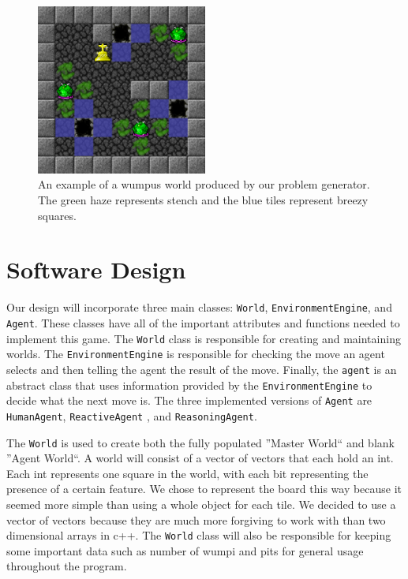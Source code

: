 \documentclass{article}
\begin{document}
		\begin{figure}
			\centering
			\includegraphics[width=0.5\textwidth]{images/ex_ww}
			\caption{An example of a wumpus world produced by our problem generator. The green haze represents stench and the blue tiles represent breezy squares.}
			\label{ex_ww}
		\end{figure}
	
	\section{Software Design}
		Our design will incorporate three main classes: \texttt{World}, \texttt{EnvironmentEngine}, and \texttt{Agent}. 
		These classes have all of the important attributes and functions needed to implement this game.
		The \texttt{World} class is responsible for creating and maintaining worlds.
		The \texttt{EnvironmentEngine} is responsible for checking the move an agent selects and then telling the agent the result of the move.
		Finally, the \texttt{agent} is an abstract class that uses information provided by the \texttt{EnvironmentEngine} to decide what the next move is. The three implemented versions of \texttt{Agent} are \texttt{HumanAgent}, \texttt{ReactiveAgent} , and \texttt{ReasoningAgent}.
		
		The \texttt{World} is used to create both the fully populated ''Master World`` and blank ''Agent World``. 
		A world will consist of a vector of vectors that each hold an int.
		Each int represents one square in the world, with each bit representing the presence of a certain feature. 
		We chose to represent the board this way because it seemed more simple than using a whole object for each tile.
		We decided to use a vector of vectors because they are much more forgiving to work with than two dimensional arrays in c++.
		The \texttt{World} class will also be responsible for keeping some important data such as number of wumpi and pits for general usage throughout the program.
		
\end{document}
